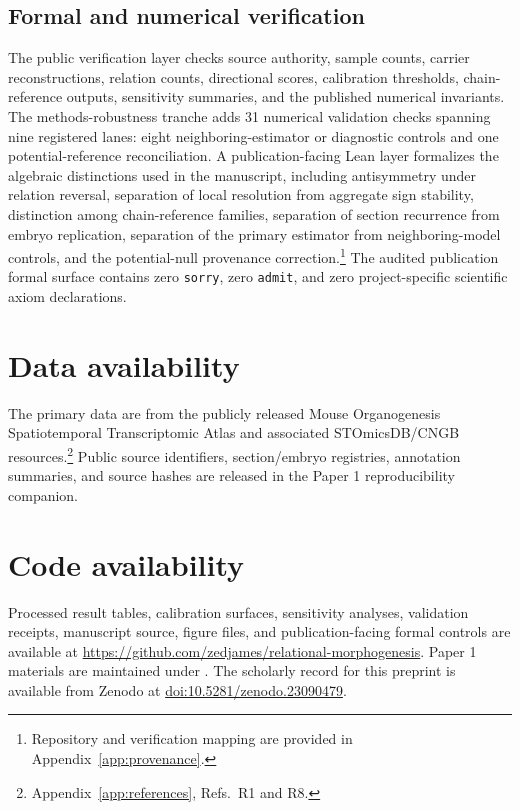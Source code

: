 \documentclass[11pt]{article}
\begin{document}
\subsection{Formal and numerical verification}

The public verification layer checks source authority, sample counts, carrier reconstructions, relation counts, directional scores, calibration thresholds, chain-reference outputs, sensitivity summaries, and the published numerical invariants. The methods-robustness tranche adds 31 numerical validation checks spanning nine registered lanes: eight neighboring-estimator or diagnostic controls and one potential-reference reconciliation. A publication-facing Lean layer formalizes the algebraic distinctions used in the manuscript, including antisymmetry under relation reversal, separation of local resolution from aggregate sign stability, distinction among chain-reference families, separation of section recurrence from embryo replication, separation of the primary estimator from neighboring-model controls, and the potential-null provenance correction.\footnote{Repository and verification mapping are provided in Appendix~\ref{app:provenance}.} The audited publication formal surface contains zero \texttt{sorry}, zero \texttt{admit}, and zero project-specific scientific axiom declarations.

\section{Data availability}

The primary data are from the publicly released Mouse Organogenesis Spatiotemporal Transcriptomic Atlas and associated STOmicsDB/CNGB resources.\footnote{Appendix~\ref{app:references}, Refs.~R1 and R8.} Public source identifiers, section/embryo registries, annotation summaries, and source hashes are released in the Paper 1 reproducibility companion.

\section{Code availability}

Processed result tables, calibration surfaces, sensitivity analyses, validation receipts, manuscript source, figure files, and publication-facing formal controls are available at
\url{https://github.com/zedjames/relational-morphogenesis}.
Paper 1 materials are maintained under
.
The scholarly record for this preprint is available from Zenodo at
\href{https://doi.org/10.5281/zenodo.23090479}{doi:10.5281/zenodo.23090479}.
\end{document}
